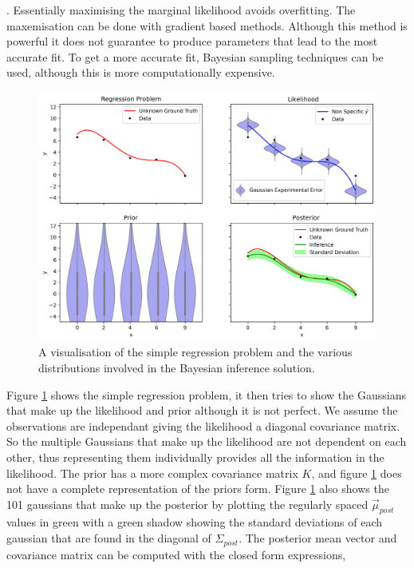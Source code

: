 \cite{oscraz} \cite{gp4ml}. Essentially maximising the marginal likelihood avoids overfitting. The maxemisation can be done with gradient based methods. Although this method is powerful it does not guarantee to produce parameters that lead to the most accurate fit. To get a more accurate fit, Bayesian sampling techniques can be used, although this is more computationally expensive.

\begin{figure}[H]
  \centering
  \includegraphics[width=13cm]{images/srpvis.png}
  \caption{A visualisation of the simple regression problem and the various distributions involved in the Bayesian inference solution.}
  \label{fig:srpvis}
\end{figure}

Figure \ref{fig:srpvis} shows the simple regression problem, it then tries to show the Gaussians that make up the likelihood and prior although it is not perfect. We assume the observations are independant giving the likelihood a diagonal covariance matrix. So the multiple Gaussians that make up the likelihood are not dependent on each other, thus representing them individually provides all the information in the likelihood. The prior has a more complex covariance matrix $K$, and figure \ref{fig:srpvis} does not have a complete representation of the priors form. Figure \ref{fig:srpvis} also shows the 101 gaussians that make up the posterior by plotting the regularly spaced $\vec{\mu}_{post}$ values in green with a green shadow showing the standard deviations of each gaussian that are found in the diagonal of $\Sigma_{post}$. The posterior mean vector and covariance matrix can be computed with the closed form expressions,

